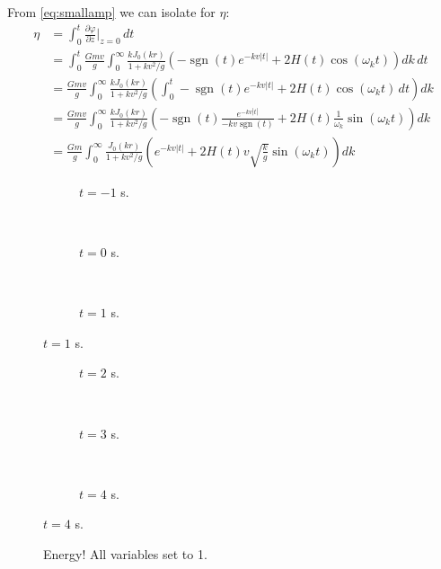 \documentclass[12pt]{article}
\DeclareMathOperator{\sgn}{sgn}
\begin{document}
From \eqref{eq:smallamp} we can isolate for $\eta$:
\begin{align*}
\eta &= \int_0^t \frac{\partial \varphi}{\partial z} \bigg|_{z=0} \, dt \\
&= \int_0^t \frac{Gmv}{g} \int_0^\infty \frac{k J_0(kr)}{1+kv^2/g} \left(-\sgn(t)e^{-kv|t|} + 2H(t)\cos(\omega_k t) \right) dk \, dt \\
&= \frac{Gmv}{g} \int_0^\infty \frac{k J_0(kr)}{1+kv^2/g} \left( \int_0^t  -\sgn(t)e^{-kv|t|} + 2H(t)\cos(\omega_k t) \, dt \right) dk \\
&= \frac{Gmv}{g} \int_0^\infty \frac{k J_0(kr)}{1+kv^2/g} \left( -\sgn(t) \frac{e^{-kv|t|}}{-k v \sgn(t)} + 2H(t)\frac{1}{\omega_k}\sin(\omega_k t) \right) dk \\
&= \frac{Gm}{g} \int_0^\infty \frac{J_0(kr)}{1+kv^2/g} \left( e^{-kv|t|} + 2H(t) v \sqrt{\frac{k}{g}} \sin(\omega_k t) \right) dk
\end{align*}






\begin{figure}[p]
\begin{centering}
 \begin{subfigure}{\textwidth}
  
  \caption{$t=-1$ s.}
 \end{subfigure} \\
 \begin{subfigure}{\textwidth}
  
  \caption{$t=0$ s.}
 \end{subfigure} \\
 \begin{subfigure}{\textwidth}
  
  \caption{$t=1$ s.}
 \end{subfigure}
\end{centering}
\end{figure}

\begin{figure}[p] \ContinuedFloat
\begin{centering}
 \begin{subfigure}{\textwidth}
  
  \caption{$t=2$ s.}
 \end{subfigure} \\
 \begin{subfigure}{\textwidth}
  
  \caption{$t=3$ s.}
 \end{subfigure} \\
  \begin{subfigure}{\textwidth}
  
  \caption{$t=4$ s.}
 \end{subfigure}
 \end{centering}
\end{figure}


\begin{figure}[p]
 
 \caption{Energy! All variables set to 1.}
\end{figure}
\end{document}
